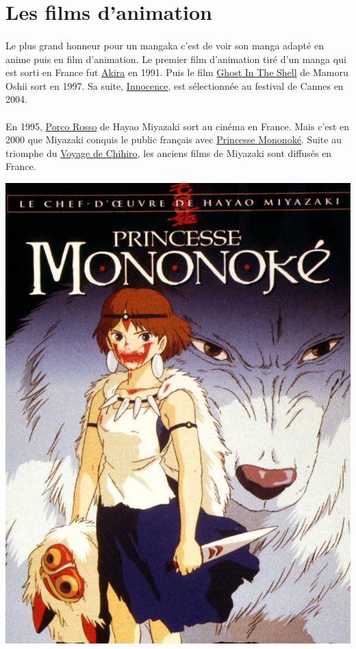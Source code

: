 \section{Les films d'animation}
\paragraph{}
Le plus grand honneur pour un mangaka c’est de voir son manga adapté en anime puis en film d’animation. Le premier film d’animation tiré d’un manga qui est sorti en France fut \underline{Akira} en 1991. Puis le film \underline{Ghost In The Shell} de Mamoru Oshii sort en 1997. Sa suite, \underline{Innocence}, est sélectionnée au festival de Cannes en 2004.
\paragraph{}
En 1995, \underline{Porco Rosso} de Hayao Miyazaki sort au cinéma en France. Mais c’est en 2000 que Miyazaki conquis le public français avec \underline{Princesse Mononoké}. Suite au triomphe du \underline{Voyage de Chihiro}, les anciens films de Miyazaki sont diffusés en France. 
\begin{center}
\includegraphics[scale=0.2]{miyazaki.jpg}
\end{center}

